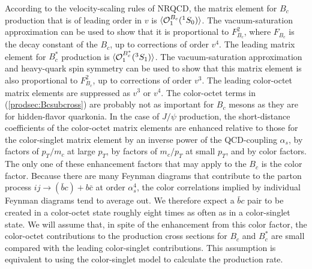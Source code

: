 According to the velocity-scaling rules of NRQCD, the matrix element for
$B_c$ production that is of leading order in $v$ is 
$\langle {\cal O}^{B_c}_1({}^1S_0) \rangle$. 
The vacuum-saturation approximation
can be used to show that it is proportional to $F_{B_c}^2$, where
$F_{B_c}$ is the decay constant of the $B_c$, up to corrections of order
$v^4$. The leading matrix element for $B_c^*$ production is 
$\langle {\cal O}^{B_c^*}_1({}^3S_1) \rangle$. The vacuum-saturation
approximation and heavy-quark spin symmetry can be used to show that
this matrix element is also proportional to $F_{B_c}^2$, up to
corrections of order $v^3$.  The leading color-octet matrix elements
are suppressed as $v^3$ or $v^4$. The color-octet terms in
(\ref{prodsec:Bcsubcross}) are probably not 
as important for $B_c$ mesons as
they are for hidden-flavor quarkonia. In the case of $J/\psi$
production, the short-distance coefficients of the color-octet matrix
elements are enhanced relative to those for the color-singlet matrix
element by an inverse power of the QCD-coupling $\alpha_s$, by factors
of $p_T/m_c$ at large $p_T$, by factors of $m_c/p_T$ at small $p_T$, and
by color factors. The only one of these enhancement factors that may
apply to the $B_c$ is the color factor. Because there are many Feynman
diagrams that contribute to the parton process $i j \to (\bar b c) + b
\bar c$ at order $\alpha_s^4$, the color correlations implied by
individual Feynman diagrams tend to average out. We therefore expect a
$\bar b c$ pair to be created in a color-octet state roughly eight times
as often as in a color-singlet state. We will assume that, in spite of
the enhancement from this color factor,  the color-octet contributions
to the production cross sections for $B_c$ and $B_c^*$ are small
compared with the leading color-singlet contributions. This assumption
is equivalent to using the color-singlet model to calculate the
production rate.
 
